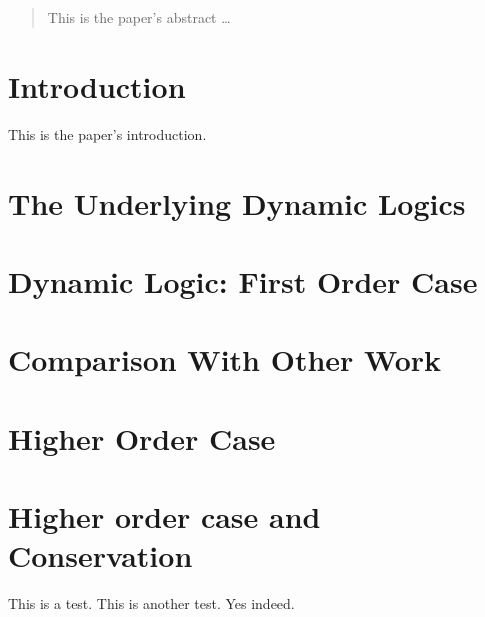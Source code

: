 \documentclass[a4paper,12pt]{article}
\begin{document}
\maketitle

\begin{abstract}
This is the paper's abstract \ldots
\end{abstract}

\section{Introduction}
This is the paper's introduction.

\section{The Underlying Dynamic Logics}




\section{Dynamic Logic: First Order Case}


\section{Comparison With Other Work}

\cite{GroenendijkStokhof:1991:Dynamic-Predicate-Logic}

\section{Higher Order Case}


\section{Higher order case and Conservation}


This is a test. This is another test. Yes indeed.




\end{document}
